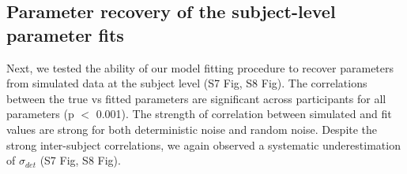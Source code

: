 \documentclass[12pt]{article}
\newcommand{\bcaption}[2]{\caption[#1]{\textbf{#1} #2}}
\renewcommand{\includegraphics}[2][]{}
\renewcommand{\caption}[1]{}
\begin{document}
%	

	\newpage
	\subsection{Parameter recovery of the subject-level parameter fits}
	Next, we tested the ability of our model fitting procedure to recover parameters from simulated data at the subject level (S7 Fig, S8 Fig). The correlations between the true vs fitted parameters are significant across participants for all parameters (p $<$ 0.001). The strength of correlation between simulated and fit values are strong for both deterministic noise and random noise. Despite the strong inter-subject correlations, we again observed a systematic underestimation of $\sigma_{det}$ (S7 Fig, S8 Fig).
	
\end{document}
